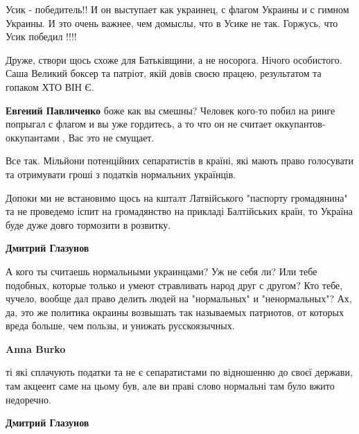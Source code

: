 \begin{itemize}
\begin{itemize}
\end{itemize} %


Усик - победитель!! И он выступает как украинец, с флагом Украины и с гимном
Украины. И это очень важнее, чем домыслы, что в Усике не так. Горжусь, что Усик
победил !!!!


Друже, створи щось схоже для Батьківщини, а не носорога. Нічого особистого.
Саша Великий боксер та патріот, якій довів своєю працею, результатом та гопаком
ХТО ВІН Є.

\begin{itemize} %
\textbf{Евгений Павличенко} боже как вы смешны? Человек кого-то побил на ринге попрыгал с флагом и вы уже гордитесь, а то что он не считает оккупантов- оккупантами , Вас это не смущает.
\end{itemize} %


Все так. Мільйони потенційних сепаратистів в країні, які мають право голосувати
та отримувати гроші з податків нормальних українців.

Допоки ми не встановимо щось на кшталт Латвійського "паспорту громадянина" та
не проведемо іспит на громадянство на прикладі Балтійських країн, то Україна
буде дуже довго тормозити в розвитку.

\begin{itemize} %
\textbf{Дмитрий Глазунов} 

А кого ты считаешь нормальными украинцами? Уж не себя ли? Или тебе подобных,
которые только и умеют стравливать народ друг с другом? Кто тебе, чучело,
вообще дал право делить людей на "нормальных" и "ненормальных"? Ах, да, это же
политика окраины возвышать так называемых патриотов, от которых вреда больше,
чем пользы, и унижать русскоязычных.

\textbf{Anna Burko} 

ті які сплачують податки та не є сепаратистами по відношенню до своєї держави,
там акцеент саме на цьому був, але ви праві слово нормальні там було вжито
недоречно.

\textbf{Дмитрий Глазунов} 


\end{itemize}
\end{itemize}

